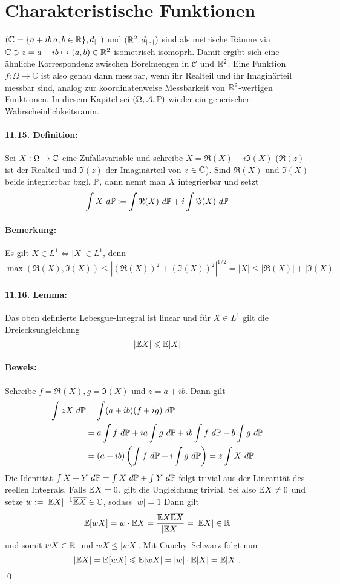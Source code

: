\section*{Charakteristische Funktionen}
$(\mathbb{C}=\{a+ib\:a,b\in\mathbb{R}\},d_{|\cdot|})$ und $(\mathbb{R}^2,d_{\Vert\cdot\Vert})$ sind als metrische R\"aume via $\mathbb{C}\ni z=a+ib\mapsto(a,b)\in\mathbb{R}^2$ isometrisch isomoprh. Damit ergibt sich eine \"ahnliche Korrespondenz zwischen Borelmengen in $\mathcal{C}$ und $\mathbb{R}^2$. Eine Funktion $f:\Omega\to\mathbb{C}$ ist also genau dann messbar, wenn ihr Realteil und ihr Imagin\"arteil messbar sind, analog zur koordinatenweise Messbarkeit von $\mathbb{R}^2$-wertigen Funktionen.  In diesem Kapitel sei $(\Omega, \mathcal{A}, \mathbb{P})$ wieder ein generischer Wahrscheinlichkeitsraum.

\paragraph{11.15. Definition:} Sei $X:\Omega\to\mathbb{C}$ eine Zufallsvariable und schreibe $X=\Re(X)+i\Im(X)$ ($\Re(z)$ ist der Realteil und $\Im(z)$ der Imagin\"arteil von $z\in\mathbb{C}$). Sind $\Re(X)$ und $\Im(X)$ beide integrierbar bzgl. $\mathbb{P}$, dann nennt man $X$ integrierbar und setzt
$$\int X\ d\Pp:=\int\Re(X)\ d\Pp+i\int\Im(X)\ d\Pp$$
\paragraph{Bemerkung:} Es gilt $X\in L^1\iff |X|\in L^1$, denn
$$\max(\Re(X),\Im(X))\leq|(\Re(X))^2+(\Im(X))^2|^{1/2}=|X|\leq|\Re(X)|+|\Im(X)|$$

\paragraph{11.16. Lemma:} Das oben definierte Lebesgue-Integral ist linear und f\"ur $X\in L^1$ gilt die Dreiecksungleichung
$$|\mathbb{E} X|\leqslant\mathbb{E}|X|$$

\paragraph{Beweis:} Schreibe $f=\Re(X),g=\Im(X)$ und $z=a+ib$. Dann gilt
\begin{align*}
	\int zX\ d\mathbb{P}&=\int (a+ib)(f+ig)\ d\mathbb{P}\\
	&=a\int f\ d\mathbb{P}+ia\int g\ d\mathbb{P}+ ib\int f\ d\mathbb{P}- b\int g\ d\mathbb{P}\\
	&=(a+ib)\left(\int f\ d\mathbb{P}+i\int g\ d\mathbb{P}\right)=z\int X\ d\mathbb{P}.
\end{align*} 
Die Identit\"at $\int X+Y\ d\mathbb{P}=\int X\ d\mathbb{P}+\int Y\ d\mathbb{P}$ folgt trivial aus der Linearit\"at des reellen Integrals. Falls $\mathbb{E} X=0$, gilt die Ungleichung trivial. Sei also $\mathbb{E} X\neq0$ und setze $w:=|\mathbb{E} X|^{-1}\overline{\mathbb{E} X}\in\mathbb{C}$, sodass $|w|=1$ Dann gilt
	$$\mathbb{E}[w X]=w\cdot \mathbb{E} X=\frac{\mathbb{E} X\overline{\mathbb{E} X}}{|\mathbb{E} X|}=|\mathbb{E} X|\in\mathbb{R}$$
	und somit $w X\in\mathbb{R}$ und $wX\leq |wX|$. Mit Cauchy--Schwarz folgt nun
	$$|\mathbb{E} X|=\mathbb{E}[wX]\leqslant\mathbb{E}|wX|= |w|\cdot \mathbb{E}|X|=\mathbb{E} |X|.$$
\qed

